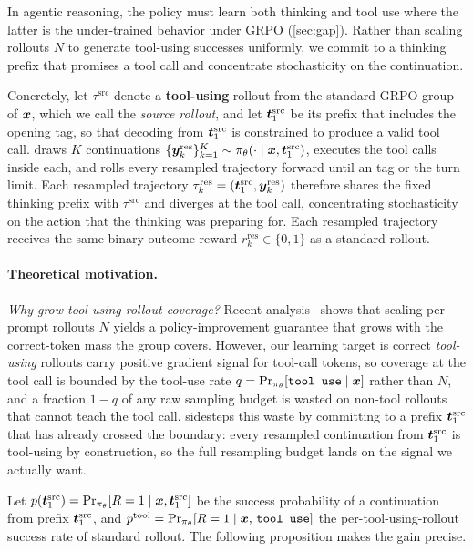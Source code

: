 In agentic reasoning, the policy must learn both thinking and tool use where the latter is the under-trained behavior under GRPO (\autoref{sec:gap}). Rather than scaling rollouts $N$ to generate tool-using successes uniformly, we commit to a thinking prefix that promises a tool call and concentrate stochasticity on the continuation.

Concretely, let $\tau^{\text{src}}$ denote a \textbf{tool-using} rollout from the standard GRPO group of ${\bm{x}}$, which we call the \emph{source rollout}, and let ${\bm{t}}_1^{\text{src}}$ be its prefix that includes the opening \toolcall tag, so that decoding from ${\bm{t}}_1^{\text{src}}$ is constrained to produce a valid tool call.
\emph{\Toolresample} draws $K$ continuations $\{{\bm{y}}_k^{\text{res}}\}_{k=1}^{K} \sim \pi_\theta(\cdot \mid {\bm{x}}, {\bm{t}}_1^{\text{src}})$, executes the tool calls inside each, and rolls every resampled trajectory forward until an \answer tag or the turn limit. Each resampled trajectory $\tau_k^{\text{res}} = ({\bm{t}}_1^{\text{src}}, {\bm{y}}_k^{\text{res}})$ therefore shares the fixed thinking prefix with $\tau^{\text{src}}$ and diverges at the tool call, concentrating stochasticity on the action that the thinking was preparing for. Each resampled trajectory receives the same binary outcome reward $r_k^{\text{res}} \in \{0,1\}$ as a standard rollout.

\paragraph{Theoretical motivation.}
\textit{Why grow tool-using rollout coverage?} Recent analysis~\citep{brorl} shows that scaling per-prompt rollouts $N$ yields a policy-improvement guarantee that grows with the correct-token mass the group covers. 
However, our learning target is correct \emph{tool-using} rollouts carry positive gradient signal for tool-call tokens, so coverage at the tool call is bounded by the tool-use rate $q = \Pr_{\pi_\theta}[\texttt{tool use} \mid {\bm{x}}]$ rather than $N$, and a fraction $1-q$ of any raw sampling budget is wasted on non-tool rollouts that cannot teach the tool call. \Toolresample sidesteps this waste by committing to a prefix ${\bm{t}}_1^{\text{src}}$ that has already crossed the \toolcall boundary: every resampled continuation from ${\bm{t}}_1^{\text{src}}$ is tool-using by construction, so the full resampling budget lands on the signal we actually want.

Let $p({\bm{t}}_1^{\text{src}}) = \Pr_{\pi_\theta}[R=1 \mid {\bm{x}}, {\bm{t}}_1^{\text{src}}]$ be the success probability of a continuation from prefix ${\bm{t}}_1^{\text{src}}$, and $p^{\text{tool}} = \Pr_{\pi_\theta}[R=1 \mid {\bm{x}},\, \texttt{tool use}]$ the per-tool-using-rollout success rate of standard rollout. The following proposition makes the gain precise.

